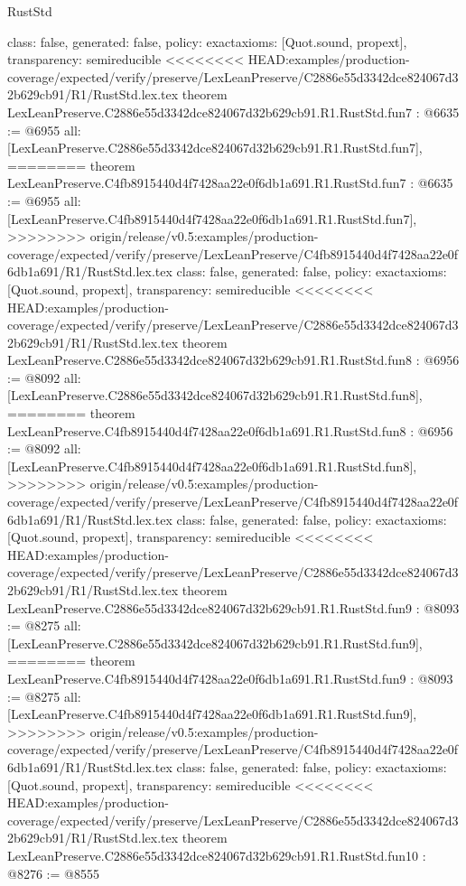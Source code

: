 \begin{lexlean}{RustStd}
\begin{coremodule}
{\begin{coremodule}
{{{{{{{{{{  class: false,
  generated: false,
  policy: exact{axioms: [Quot.sound, propext]},
  transparency: semireducible
}
<<<<<<<< HEAD:examples/production-coverage/expected/verify/preserve/LexLeanPreserve/C2886e55d3342dce824067d32b629cb91/R1/RustStd.lex.tex
theorem LexLeanPreserve.C2886e55d3342dce824067d32b629cb91.R1.RustStd.fun7 : @6635 := @6955 {
  all: [LexLeanPreserve.C2886e55d3342dce824067d32b629cb91.R1.RustStd.fun7],
========
theorem LexLeanPreserve.C4fb8915440d4f7428aa22e0f6db1a691.R1.RustStd.fun7 : @6635 := @6955 {
  all: [LexLeanPreserve.C4fb8915440d4f7428aa22e0f6db1a691.R1.RustStd.fun7],
>>>>>>>> origin/release/v0.5:examples/production-coverage/expected/verify/preserve/LexLeanPreserve/C4fb8915440d4f7428aa22e0f6db1a691/R1/RustStd.lex.tex
  class: false,
  generated: false,
  policy: exact{axioms: [Quot.sound, propext]},
  transparency: semireducible
}
<<<<<<<< HEAD:examples/production-coverage/expected/verify/preserve/LexLeanPreserve/C2886e55d3342dce824067d32b629cb91/R1/RustStd.lex.tex
theorem LexLeanPreserve.C2886e55d3342dce824067d32b629cb91.R1.RustStd.fun8 : @6956 := @8092 {
  all: [LexLeanPreserve.C2886e55d3342dce824067d32b629cb91.R1.RustStd.fun8],
========
theorem LexLeanPreserve.C4fb8915440d4f7428aa22e0f6db1a691.R1.RustStd.fun8 : @6956 := @8092 {
  all: [LexLeanPreserve.C4fb8915440d4f7428aa22e0f6db1a691.R1.RustStd.fun8],
>>>>>>>> origin/release/v0.5:examples/production-coverage/expected/verify/preserve/LexLeanPreserve/C4fb8915440d4f7428aa22e0f6db1a691/R1/RustStd.lex.tex
  class: false,
  generated: false,
  policy: exact{axioms: [Quot.sound, propext]},
  transparency: semireducible
}
<<<<<<<< HEAD:examples/production-coverage/expected/verify/preserve/LexLeanPreserve/C2886e55d3342dce824067d32b629cb91/R1/RustStd.lex.tex
theorem LexLeanPreserve.C2886e55d3342dce824067d32b629cb91.R1.RustStd.fun9 : @8093 := @8275 {
  all: [LexLeanPreserve.C2886e55d3342dce824067d32b629cb91.R1.RustStd.fun9],
========
theorem LexLeanPreserve.C4fb8915440d4f7428aa22e0f6db1a691.R1.RustStd.fun9 : @8093 := @8275 {
  all: [LexLeanPreserve.C4fb8915440d4f7428aa22e0f6db1a691.R1.RustStd.fun9],
>>>>>>>> origin/release/v0.5:examples/production-coverage/expected/verify/preserve/LexLeanPreserve/C4fb8915440d4f7428aa22e0f6db1a691/R1/RustStd.lex.tex
  class: false,
  generated: false,
  policy: exact{axioms: [Quot.sound, propext]},
  transparency: semireducible
}
<<<<<<<< HEAD:examples/production-coverage/expected/verify/preserve/LexLeanPreserve/C2886e55d3342dce824067d32b629cb91/R1/RustStd.lex.tex
theorem LexLeanPreserve.C2886e55d3342dce824067d32b629cb91.R1.RustStd.fun10 : @8276 := @8555 {
}}}}}}}}}}}}}
\end{coremodule}}
\end{coremodule}
\end{lexlean}
